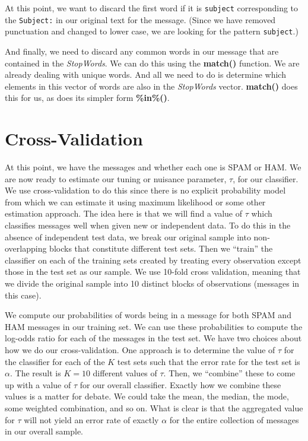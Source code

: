 \documentclass{article}
\def\SFunction#1{\textbf{#1()}}
\def\SVariable#1{\textsl{#1}}
\begin{document}
At this point, we want to discard the first word if it is
\texttt{subject} corresponding to the \texttt{Subject:} in our
original text for the message.  (Since we have removed punctuation and
changed to lower case, we are looking for the pattern
\texttt{subject}.)

And finally, we need to discard any common words in our message that
are contained in the \SVariable{StopWords}.  We can do this using the
\SFunction{match} function.  We are already dealing with unique words.
And all we need to do is determine which elements in this vector of
words are also in the \SVariable{StopWords} vector.  \SFunction{match}
does this for us, as does its simpler form \SFunction{\%in\%}.


\section{Cross-Validation}
At this point, we have the messages and whether each one is SPAM or
HAM.  We are now ready to estimate our tuning or nuisance parameter,
$\tau$, for our classifier.  We use cross-validation to do this since
there is no explicit probability model from which we can estimate it
using maximum likelihood or some other estimation approach.  The idea
here is that we will find a value of $\tau$ which classifies messages
well when given new or independent data.  To do this in the absence of
independent test data, we break our original sample into
non-overlapping blocks that constitute different test sets.  Then we
``train'' the classifier on each of the training sets created by
treating every observation except those in the test set as our sample.
We use 10-fold cross validation, meaning that we divide the original
sample into 10 distinct blocks of observations (messages in this
case). 

We compute our probabilities of words being in a message for both SPAM
and HAM messages in our training set.  We can use these probabilities
to compute the log-odds ratio for each of the messages in the test
set.  We have two choices about how we do our cross-validation.  One
approach is to determine the value of $\tau$ for the classifier for
each of the $K$ test sets such that the error rate for the test set is
$\alpha$.  The result is $K = 10$ different values of $\tau$.  Then,
we ``combine'' these to come up with a value of $\tau$ for our overall
classifier.  Exactly how we combine these values is a matter for
debate.  We could take the mean, the median, the mode, some weighted
combination, and so on.  What is clear is that the aggregated value
for $\tau$ will not yield an error rate of exactly $\alpha$ for the
entire collection of messages in our overall sample. 
\end{document}
